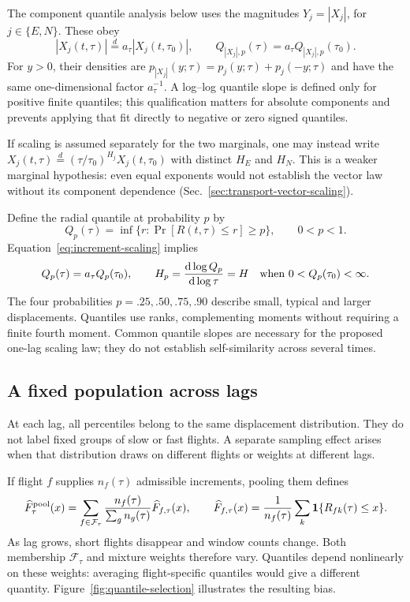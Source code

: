 The component quantile analysis below uses the magnitudes $Y_j=|X_j|$,
for $j\in\{E,N\}$. These obey
\begin{equation}
 |X_j(t,\tau)|\overset d=a_\tau|X_j(t,\tau_0)|,\qquad
 Q_{|X_j|,p}(\tau)=a_\tau Q_{|X_j|,p}(\tau_0).
 \label{eq:absolute-component-scaling}
\end{equation}
For $y>0$, their densities are
$p_{|X_j|}(y;\tau)=p_j(y;\tau)+p_j(-y;\tau)$ and have the same
one-dimensional factor $a_\tau^{-1}$. A log--log quantile slope is defined only
for positive finite quantiles; this qualification matters for absolute
components and prevents applying that fit directly to negative or zero signed
quantiles.

If scaling is assumed separately for the two marginals, one may instead write
$X_j(t,\tau)\overset d=(\tau/\tau_0)^{H_j}X_j(t,\tau_0)$ with distinct
$H_E$ and $H_N$. This is a weaker marginal hypothesis: even equal exponents
would not establish the vector law without its component dependence
(Sec.~\ref{sec:transport-vector-scaling}).

Define the radial quantile at probability $p$ by
\begin{equation}
  Q_p(\tau)=\inf\{r:\Pr[R(t,\tau)\le r]\ge p\},\qquad 0<p<1.
  \label{eq:quantile-definition}
\end{equation}
Equation~\eqref{eq:increment-scaling} implies
\begin{equation}
  Q_p(\tau)=a_\tau Q_p(\tau_0),\qquad
  H_p=\frac{\mathrm d\log Q_p}{\mathrm d\log\tau}=H
  \quad\hbox{when }0<Q_p(\tau_0)<\infty.
  \label{eq:quantile-hurst}
\end{equation}
The four probabilities $p=.25,.50,.75,.90$ describe small, typical and larger
displacements. Quantiles use ranks, complementing moments without requiring a finite
fourth moment. Common quantile slopes are necessary for the proposed one-lag scaling
law; they do not establish self-similarity across several times.

\subsection{A fixed population across lags}
\label{sec:quantile-population}

At each lag, all percentiles belong to the same displacement distribution.
They do not label fixed groups of slow or fast flights. A separate sampling effect
arises when that distribution draws on different flights or weights at different lags.

If flight $f$ supplies $n_f(\tau)$ admissible increments, pooling
them defines
\begin{equation}
 \widehat F_\tau^{\rm pool}(x)
 =\sum_{f\in\mathcal F_\tau}
    \frac{n_f(\tau)}{\sum_g n_g(\tau)}\widehat F_{f,\tau}(x),\qquad
 \widehat F_{f,\tau}(x)=\frac1{n_f(\tau)}\sum_k
                   \mathbf1\{R_{fk}(\tau)\le x\}.
 \label{eq:quantile-mixture}
\end{equation}
As lag grows, short flights disappear and window counts change. Both membership
$\mathcal F_\tau$ and mixture weights therefore vary. Quantiles depend nonlinearly
on these weights: averaging flight-specific quantiles would give a different
quantity. Figure~\ref{fig:quantile-selection} illustrates the resulting bias.

